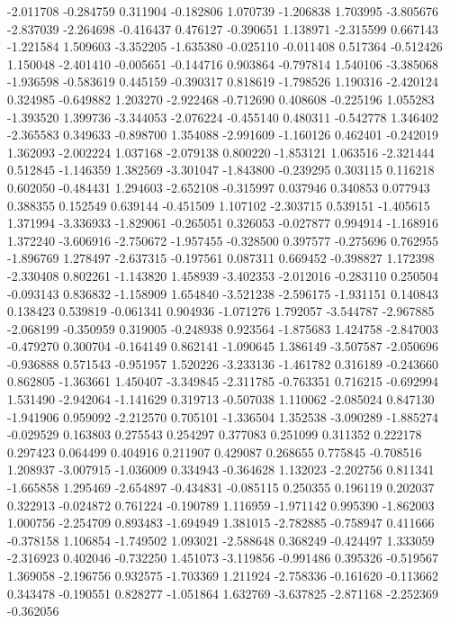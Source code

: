 -2.011708
-0.284759
0.311904
-0.182806
1.070739
-1.206838
1.703995
-3.805676
-2.837039
-2.264698
-0.416437
0.476127
-0.390651
1.138971
-2.315599
0.667143
-1.221584
1.509603
-3.352205
-1.635380
-0.025110
-0.011408
0.517364
-0.512426
1.150048
-2.401410
-0.005651
-0.144716
0.903864
-0.797814
1.540106
-3.385068
-1.936598
-0.583619
0.445159
-0.390317
0.818619
-1.798526
1.190316
-2.420124
0.324985
-0.649882
1.203270
-2.922468
-0.712690
0.408608
-0.225196
1.055283
-1.393520
1.399736
-3.344053
-2.076224
-0.455140
0.480311
-0.542778
1.346402
-2.365583
0.349633
-0.898700
1.354088
-2.991609
-1.160126
0.462401
-0.242019
1.362093
-2.002224
1.037168
-2.079138
0.800220
-1.853121
1.063516
-2.321444
0.512845
-1.146359
1.382569
-3.301047
-1.843800
-0.239295
0.303115
0.116218
0.602050
-0.484431
1.294603
-2.652108
-0.315997
0.037946
0.340853
0.077943
0.388355
0.152549
0.639144
-0.451509
1.107102
-2.303715
0.539151
-1.405615
1.371994
-3.336933
-1.829061
-0.265051
0.326053
-0.027877
0.994914
-1.168916
1.372240
-3.606916
-2.750672
-1.957455
-0.328500
0.397577
-0.275696
0.762955
-1.896769
1.278497
-2.637315
-0.197561
0.087311
0.669452
-0.398827
1.172398
-2.330408
0.802261
-1.143820
1.458939
-3.402353
-2.012016
-0.283110
0.250504
-0.093143
0.836832
-1.158909
1.654840
-3.521238
-2.596175
-1.931151
0.140843
0.138423
0.539819
-0.061341
0.904936
-1.071276
1.792057
-3.544787
-2.967885
-2.068199
-0.350959
0.319005
-0.248938
0.923564
-1.875683
1.424758
-2.847003
-0.479270
0.300704
-0.164149
0.862141
-1.090645
1.386149
-3.507587
-2.050696
-0.936888
0.571543
-0.951957
1.520226
-3.233136
-1.461782
0.316189
-0.243660
0.862805
-1.363661
1.450407
-3.349845
-2.311785
-0.763351
0.716215
-0.692994
1.531490
-2.942064
-1.141629
0.319713
-0.507038
1.110062
-2.085024
0.847130
-1.941906
0.959092
-2.212570
0.705101
-1.336504
1.352538
-3.090289
-1.885274
-0.029529
0.163803
0.275543
0.254297
0.377083
0.251099
0.311352
0.222178
0.297423
0.064499
0.404916
0.211907
0.429087
0.268655
0.775845
-0.708516
1.208937
-3.007915
-1.036009
0.334943
-0.364628
1.132023
-2.202756
0.811341
-1.665858
1.295469
-2.654897
-0.434831
-0.085115
0.250355
0.196119
0.202037
0.322913
-0.024872
0.761224
-0.190789
1.116959
-1.971142
0.995390
-1.862003
1.000756
-2.254709
0.893483
-1.694949
1.381015
-2.782885
-0.758947
0.411666
-0.378158
1.106854
-1.749502
1.093021
-2.588648
0.368249
-0.424497
1.333059
-2.316923
0.402046
-0.732250
1.451073
-3.119856
-0.991486
0.395326
-0.519567
1.369058
-2.196756
0.932575
-1.703369
1.211924
-2.758336
-0.161620
-0.113662
0.343478
-0.190551
0.828277
-1.051864
1.632769
-3.637825
-2.871168
-2.252369
-0.362056
